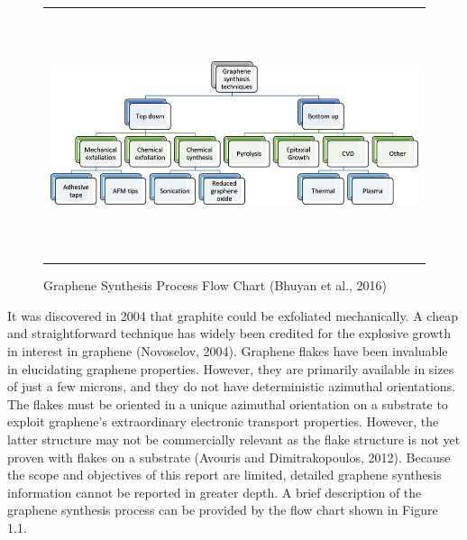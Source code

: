 \documentclass[a4paper,12pt]{article}
\numberwithin{equation}{section}
\numberwithin{figure}{section}
\begin{document}
\begin{figure}[H]
  \centering
  \begin{tabular}{@{}c@{}}
    \includegraphics[width=0.9\linewidth,height=205pt]{Figures/Figure1.1.jpg} \\
  \end{tabular}
  \caption{Graphene Synthesis Process Flow Chart (Bhuyan et al., 2016)}
\end{figure}

\noindent It was discovered in 2004 that graphite could be exfoliated mechanically. A cheap and straightforward technique has widely been credited for the explosive growth in interest in graphene (Novoselov, 2004). Graphene flakes have been invaluable in elucidating graphene properties. However, they are primarily available in sizes of just a few microns, and they do not have deterministic azimuthal orientations. The flakes must be oriented in a unique azimuthal orientation on a substrate to exploit graphene’s extraordinary electronic transport properties. However, the latter structure may not be commercially relevant as the flake structure is not yet proven with flakes on a substrate (Avouris and Dimitrakopoulos, 2012). Because the scope and objectives of this report are limited, detailed graphene synthesis information cannot be reported in greater depth. A brief description of the graphene synthesis process can be provided by the flow chart shown in Figure 1.1.\vspace{\baselineskip}
\end{document}
